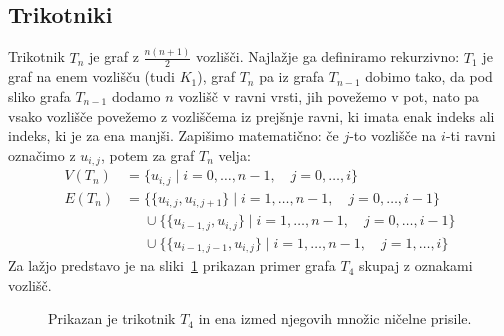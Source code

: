 \documentclass[12pt,a4paper,twoside]{article}
\theoremstyle{definition} %
\theoremstyle{plain} %
\numberwithin{equation}{section}  %
\begin{document}
\subsection{Trikotniki}
Trikotnik $T_n$ je graf z $\frac{n (n+1)}{2}$ vozlišči. Najlažje ga definiramo rekurzivno:
$T_1$ je graf na enem vozlišču (tudi $K_1$), graf $T_n$ pa iz grafa $T_{n-1}$ dobimo tako, da pod sliko grafa $T_{n-1}$ dodamo $n$ vozlišč v ravni vrsti, jih povežemo v pot, nato pa vsako vozlišče povežemo z vozliščema iz prejšnje ravni, ki imata enak indeks ali indeks, ki je za ena manjši. Zapišimo matematično: če $j$-to vozlišče na $i$-ti ravni označimo z $u_{i,j}$, potem za graf $T_n$ velja:
\begin{align*}
    V(T_n) &= \{u_{i,j} \mid i=0,\ldots,n-1, \quad j=0,\ldots,i \} \\
    E(T_n) &= \{ \{u_{i,j}, u_{i, j+1} \} \mid i=1,\ldots,n-1, \quad j=0,\ldots,i-1  \} 
    \\ &\phantom{=} \cup \{ \{ u_{i-1, j}, u_{i,j}  \} \mid i=1,\ldots,n-1, \quad j=0,\ldots,i-1  \} 
    \\ &\phantom{=} \cup \{ \{ u_{i-1, j-1},u_{i,j} \} \mid i=1,\ldots,n-1, \quad j=1,\ldots,i \} 
\end{align*}
Za lažjo predstavo je na sliki~\ref{fig:trikotnik} prikazan primer grafa $T_4$ skupaj z oznakami vozlišč.
\begin{figure}[h]
    \centering
    \caption{Prikazan je trikotnik $T_4$ in ena izmed njegovih množic ničelne prisile.}
    \label{fig:trikotnik}
\end{figure}
\end{document}
